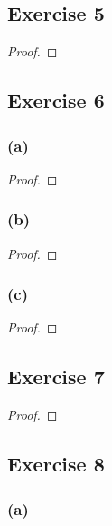 \documentclass[14pt]{extarticle}
\begin{document}
\subsection{Exercise 5}

\begin{proof}

\end{proof}

\subsection{Exercise 6}

\subsubsection{(a)}

\begin{proof}

\end{proof}

\subsubsection{(b)}

\begin{proof}

\end{proof}

\subsubsection{(c)}

\begin{proof}

\end{proof}

\subsection{Exercise 7}

\begin{proof}

\end{proof}

\subsection{Exercise 8}

\subsubsection{(a)}
\end{document}
